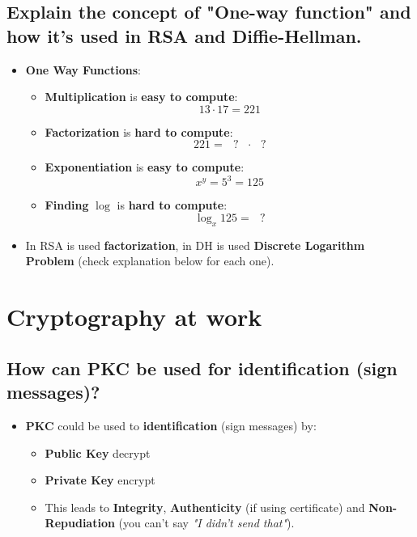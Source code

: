 \documentclass[9pt, letterpaper]{article}
\begin{document}
\subsection{Explain the concept of "One-way function" and how it's used in RSA and Diffie-Hellman.}
\begin{itemize}
	\item \textbf{One Way Functions}:
	\begin{itemize}
		\item \textbf{Multiplication} is \textbf{easy to compute}: $$ 13\cdot 17 = 221 $$
		\item \textbf{Factorization} is \textbf{hard to compute}: $$ 221 = \mbox{  } ? \mbox{ }\cdot \mbox{ } ? $$
		\item \textbf{Exponentiation} is \textbf{easy to compute}: $$ x^y = 5^3 = 125 $$
		\item \textbf{Finding} $\log$ is \textbf{hard to compute}: $$ \log_x125 = \mbox{ } ? $$
	\end{itemize}
	\item In RSA is used \textbf{factorization}, in \textsc{DH} is used \textbf{Discrete Logarithm Problem} (check explanation below for each one).
\end{itemize}

\newpage

\section{Cryptography at work}

\subsection{How can PKC be used for identification (sign messages)?}
\begin{itemize}
	\item \textbf{PKC} could be used to \textbf{identification} (sign messages) by:
	\begin{itemize}
		\item \textbf{Public Key} decrypt
		\item \textbf{Private Key} encrypt
		\item This leads to \textbf{Integrity}, \textbf{Authenticity} (if using certificate) and \textbf{Non-Repudiation} (you can't say \textit{"I didn't send that"}).
	\end{itemize}
\end{itemize}
\end{document}
